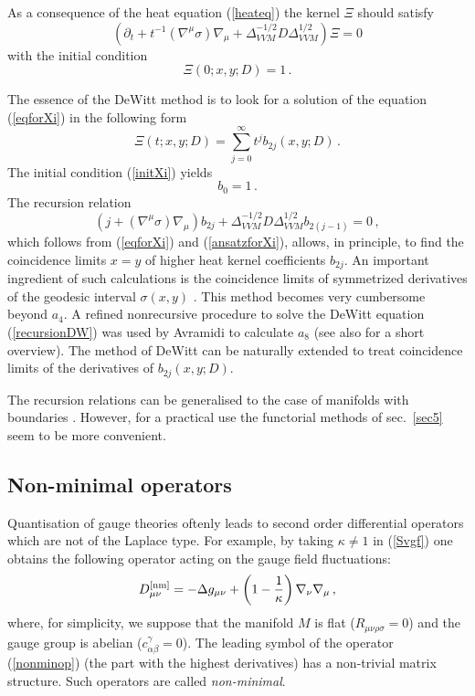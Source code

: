 As a consequence of the heat equation (\ref{heateq}) the kernel
$\Xi$ should satisfy
\begin{equation}
\left( \partial_t +t^{-1} (\nabla^\mu \sigma )\nabla_\mu +
\Delta_{VVM}^{-1/2} D \Delta_{VVM}^{1/2} \right) \Xi =0
\label{eqforXi}
\end{equation}
with the initial condition
\begin{equation}
\Xi (0;x,y;D)=1 \,.\label{initXi}
\end{equation}

The essence of the DeWitt method is to look for a solution of the
equation (\ref{eqforXi}) in the following form
\begin{equation}
\Xi (t;x,y;D) = \sum_{j=0}^\infty t^{j}b_{2j}(x,y;D)\,.
\label{ansatzforXi}
\end{equation}
The initial condition (\ref{initXi}) yields
\begin{equation}
b_0=1\,.\label{b0DW}
\end{equation}
The recursion relation 
\begin{equation}
\left( j +(\nabla^\mu \sigma )\nabla_\mu \right) b_{2j}+
\Delta_{VVM}^{-1/2} D \Delta_{VVM}^{1/2} b_{2(j-1)}=0\,,
\label{recursionDW}
\end{equation}
which follows from (\ref{eqforXi}) and (\ref{ansatzforXi}),
allows, in principle, to find the coincidence limits $x=y$
of higher heat kernel coefficients $b_{2j}$. An important
ingredient of such calculations is the coincidence limits
of symmetrized derivatives of the geodesic interval $\sigma (x,y)$
\cite{Synge:1931,Barvinsky:1985an}. This method becomes
very cumbersome beyond $a_4$. A refined nonrecursive procedure
to solve the DeWitt equation (\ref{recursionDW}) was used
by Avramidi \cite{Avramidi:1991je} to calculate $a_8$
(see also \cite{Avramidi:2001ns} for a short overview).
The method of DeWitt can be naturally extended to treat
coincidence limits of the derivatives of $b_{2j}(x,y;D)$.

The recursion relations can be generalised to the case
of manifolds with boundaries \cite{McAvity:1991we,McAvity:1992rf}.
However, for a practical use the functorial methods of sec.\ 
{\ref{sec5}} seem to be more convenient.
\subsection{Non-minimal operators}\label{s4nonmin}
Quantisation of gauge theories oftenly leads to second order
differential operators which are not of the Laplace type.
For example, by taking $\kappa\ne 1$ in (\ref{Svgf}) 
one obtains the following operator acting on the gauge field
fluctuations:
\begin{equation}
D^{[{\rm nm}]}_{\mu\nu} =-\Delta g_{\mu\nu} +
\left( 1-\frac 1\kappa \right) \nabla_\nu\nabla_\mu \,,
\label{nonminop}
\end{equation}
where, for simplicity, we suppose that the manifold $M$ is flat
($R_{\mu\nu\rho\sigma}=0$) and the gauge group is abelian
($c_{\alpha\beta}^\gamma=0$). The leading symbol of the operator
(\ref{nonminop}) (the part with the highest derivatives) has a 
non-trivial matrix structure. Such operators are called {\it 
non-minimal}.


